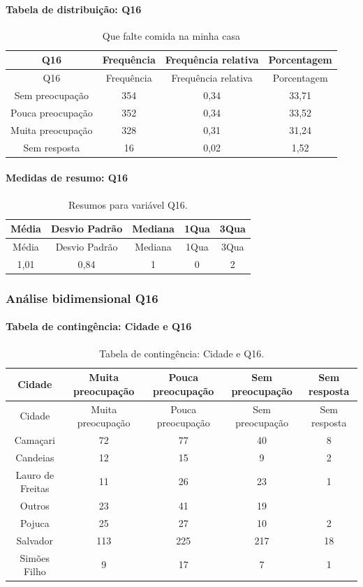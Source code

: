 \documentclass[]{article}
\let\oldparagraph\paragraph
\renewcommand{\paragraph}[1]{\oldparagraph{#1}\mbox{}}
\begin{document}
\hypertarget{tabela-de-distribuiuxe7uxe3o-q16}{%
\paragraph{Tabela de distribuição: Q16}\label{tabela-de-distribuiuxe7uxe3o-q16}}

\begin{longtable}[]{@{}cccc@{}}
\caption{\label{tab:unnamed-chunk-129}Que falte comida na minha casa}\tabularnewline
\toprule
Q16 & Frequência & Frequência relativa & Porcentagem\tabularnewline
\midrule
\endfirsthead
\toprule
Q16 & Frequência & Frequência relativa & Porcentagem\tabularnewline
\midrule
\endhead
Sem preocupação & 354 & 0,34 & 33,71\tabularnewline
Pouca preocupação & 352 & 0,34 & 33,52\tabularnewline
Muita preocupação & 328 & 0,31 & 31,24\tabularnewline
Sem resposta & 16 & 0,02 & 1,52\tabularnewline
\bottomrule
\end{longtable}

\hypertarget{medidas-de-resumo-q16}{%
\paragraph{Medidas de resumo: Q16}\label{medidas-de-resumo-q16}}

\begin{longtable}[]{@{}ccccc@{}}
\caption{\label{tab:unnamed-chunk-130}Resumos para variável Q16.}\tabularnewline
\toprule
Média & Desvio Padrão & Mediana & 1Qua & 3Qua\tabularnewline
\midrule
\endfirsthead
\toprule
Média & Desvio Padrão & Mediana & 1Qua & 3Qua\tabularnewline
\midrule
\endhead
1,01 & 0,84 & 1 & 0 & 2\tabularnewline
\bottomrule
\end{longtable}

\cleardoublepage

\hypertarget{anuxe1lise-bidimensional-q16}{%
\subsubsection{Análise bidimensional Q16}\label{anuxe1lise-bidimensional-q16}}

\hypertarget{tabela-de-continguxeancia-cidade-e-q16}{%
\paragraph{Tabela de contingência: Cidade e Q16}\label{tabela-de-continguxeancia-cidade-e-q16}}

\begin{longtable}[]{@{}ccccc@{}}
\caption{\label{tab:unnamed-chunk-131}Tabela de contingência: Cidade e Q16.}\tabularnewline
\toprule
Cidade & Muita preocupação & Pouca preocupação & Sem preocupação & Sem resposta\tabularnewline
\midrule
\endfirsthead
\toprule
Cidade & Muita preocupação & Pouca preocupação & Sem preocupação & Sem resposta\tabularnewline
\midrule
\endhead
Camaçari & 72 & 77 & 40 & 8\tabularnewline
Candeias & 12 & 15 & 9 & 2\tabularnewline
Lauro de Freitas & 11 & 26 & 23 & 1\tabularnewline
Outros & 23 & 41 & 19 &\tabularnewline
Pojuca & 25 & 27 & 10 & 2\tabularnewline
Salvador & 113 & 225 & 217 & 18\tabularnewline
Simões Filho & 9 & 17 & 7 & 1\tabularnewline
\bottomrule
\end{longtable}
\end{document}
